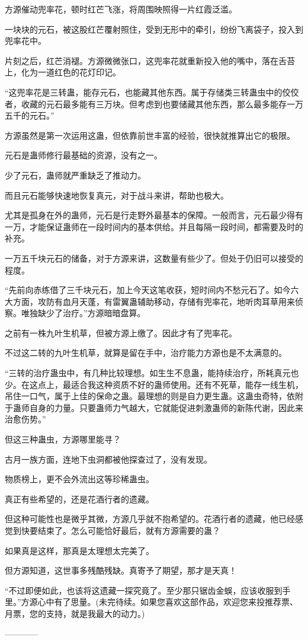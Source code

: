 \begin{this_body}
方源催动兜率花，顿时红芒飞涨，将周围映照得一片红霞泛滥。

一块块的元石，被这股红芒覆射照住，受到无形中的牵引，纷纷飞离袋子，投入到兜率花中。

片刻之后，红芒消褪。方源微微张口，这兜率花就重新投入他的嘴中，落在舌苔上，化为一道红色的花灯印记。

“这兜率花是三转蛊，能存元石，也能藏其他东西。属于存储类三转蛊虫中的佼佼者，收藏的元石最多能有三万块。但考虑到也要储藏其他东西，那么最多能存一万五千的元石。”

方源虽然是第一次运用这蛊，但依靠前世丰富的经验，很快就推算出它的极限。

元石是蛊师修行最基础的资源，没有之一。

少了元石，蛊师就严重缺乏了推动力。

而且元石能够快速地恢复真元，对于战斗来讲，帮助也极大。

尤其是孤身在外的蛊师，元石是行走野外最基本的保障。一般而言，元石最少得有一万，才能保证蛊师在一段时间内的基本供给。并且每隔一段时间，都需要及时的补充。

一万五千块元石的储备，对于方源来讲，这数量有些少了。但处于仍旧可以接受的程度。

“先前向赤练借了三千块元石，加上今天这笔收获，短时间内不愁元石了。如今六大方面，攻防有血月天蓬，有雷翼蛊辅助移动，存储有兜率花，地听肉耳草用来侦察。唯独缺少了治疗。”方源暗暗盘算。

之前有一株九叶生机草，但被方源上缴了。因此才有了兜率花。

不过这二转的九叶生机草，就算是留在手中，治疗能力方源也是不太满意的。

“三转的治疗蛊虫中，有几种比较理想。如生生不息蛊，能持续治疗，所耗真元也少。在这点上，最适合我这种资质不好的蛊师使用。还有不死草，能存一线生机，吊住一口气，属于上佳的保命之蛊。最理想的则是自力更生蛊。这蛊虫奇特，依附于蛊师自身的力量。只要蛊师力气越大，它就能促进刺激蛊师的新陈代谢，因此来治愈伤势。”

但这三种蛊虫，方源哪里能寻？

古月一族方面，连地下虫洞都被他探查过了，没有发现。

物质榜上，更不会外流出这等珍稀蛊虫。

真正有些希望的，还是花酒行者的遗藏。

但这种可能性也是微乎其微，方源几乎就不抱希望的。花酒行者的遗藏，他已经感觉到快要结束了。怎么可能恰好最后，就有方源需要的蛊？

如果真是这样，那真是太理想太完美了。

但方源知道，这世事多残酷残缺。真寄予了期望，那才是天真！

“不过即便如此，也该将这遗藏一探究竟了。至少那只锯齿金蜈，应该收服到手里。”方源心中有了思量。(未完待续。如果您喜欢这部作品，欢迎您来投推荐票、月票，您的支持，就是我最大的动力。)

------------

\end{this_body}

